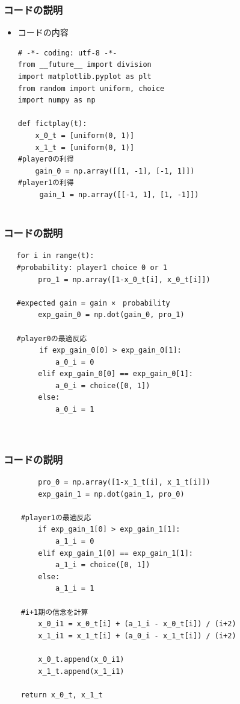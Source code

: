 \documentclass[dvipdfmx,fleqn,handout]{beamer}
\begin{document}
\begin{frame}[containsverbatim]%
\frametitle{コードの説明}
\begin{itemize}\setlength{\parskip}{0.5em}
\item
コードの内容
\begin{verbatim}
# -*- coding: utf-8 -*-
from __future__ import division  
import matplotlib.pyplot as plt
from random import uniform, choice
import numpy as np

def fictplay(t):
    x_0_t = [uniform(0, 1)]
    x_1_t = [uniform(0, 1)]
#player0の利得
    gain_0 = np.array([[1, -1], [-1, 1]])
#player1の利得
     gain_1 = np.array([[-1, 1], [1, -1]]) 
	　　
\end{verbatim}

\end{itemize}
\end{frame}

\begin{frame}[containsverbatim]%
\frametitle{コードの説明}
\begin{verbatim}
   for i in range(t):
   #probability: player1 choice 0 or 1
        pro_1 = np.array([1-x_0_t[i], x_0_t[i]])      
		　　　
   #expected gain = gain ×　probability　　　　  　　　　
　　　   exp_gain_0 = np.dot(gain_0, pro_1)            
        
   #player0の最適反応
　　　　　if exp_gain_0[0] > exp_gain_0[1]:
            a_0_i = 0
        elif exp_gain_0[0] == exp_gain_0[1]:
            a_0_i = choice([0, 1])
        else:
            a_0_i = 1
                
                
\end{verbatim}

\end{frame}

\begin{frame}[containsverbatim]%
\frametitle{コードの説明}
\begin{verbatim}
        pro_0 = np.array([1-x_1_t[i], x_1_t[i]])   
        exp_gain_1 = np.dot(gain_1, pro_0)
		
    #player1の最適反応
        if exp_gain_1[0] > exp_gain_1[1]:
            a_1_i = 0
        elif exp_gain_1[0] == exp_gain_1[1]:
            a_1_i = choice([0, 1])
        else:
            a_1_i = 1
			　　　
    #i+1期の信念を計算
        x_0_i1 = x_0_t[i] + (a_1_i - x_0_t[i]) / (i+2)
        x_1_i1 = x_1_t[i] + (a_0_i - x_1_t[i]) / (i+2)
		　　　　　 
        x_0_t.append(x_0_i1)
        x_1_t.append(x_1_i1)

    return x_0_t, x_1_t

\end{verbatim}

\end{frame}
\end{document}
